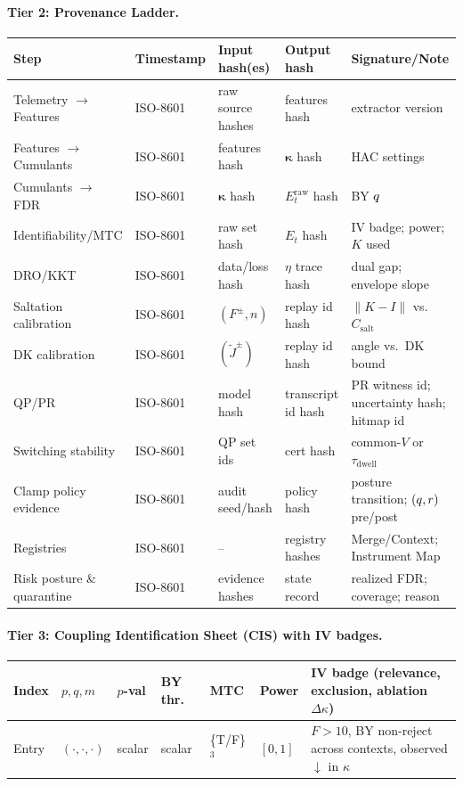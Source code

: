 \paragraph{Tier 2: Provenance Ladder.}
\begin{center}
\renewcommand{\arraystretch}{1.12}
\begin{tabularx}{\textwidth}{@{} l l X X X @{}}
\toprule
\textbf{Step} & \textbf{Timestamp} & \textbf{Input hash(es)} & \textbf{Output hash} & \textbf{Signature/Note} \\
\midrule
Telemetry $\to$ Features & ISO-8601 & raw source hashes & features hash & extractor version \\
Features $\to$ Cumulants & ISO-8601 & features hash & $\bm\kappa$ hash & HAC settings \\
Cumulants $\to$ FDR & ISO-8601 & $\bm\kappa$ hash & $E_t^{\mathrm{raw}}$ hash & BY $q$ \\
Identifiability/MTC & ISO-8601 & raw set hash & $E_t$ hash & IV badge; power; $K$ used \\
DRO/KKT & ISO-8601 & data/loss hash & $\eta$ trace hash & dual gap; envelope slope \\
Saltation calibration & ISO-8601 & $(F^\pm,n)$ & replay id hash & $\|K{-}I\|$ vs.\ $C_{\mathrm{salt}}$ \\
DK calibration & ISO-8601 & $(\widetilde J^\pm)$ & replay id hash & angle vs.\ DK bound \\
QP/PR & ISO-8601 & model hash & transcript id hash & PR witness id; uncertainty hash; hitmap id \\
Switching stability & ISO-8601 & QP set ids & cert hash & common-$V$ or $\tau_{\mathrm{dwell}}$ \\
Clamp policy evidence & ISO-8601 & audit seed/hash & policy hash & posture transition; $(q,r)$ pre/post \\
Registries & ISO-8601 & – & registry hashes & Merge/Context; Instrument Map \\
Risk posture \& quarantine & ISO-8601 & evidence hashes & state record & realized FDR; coverage; reason \\
\bottomrule
\end{tabularx}
\end{center}

\paragraph{Tier 3: Coupling Identification Sheet (CIS) with IV badges.}
\begin{center}
\renewcommand{\arraystretch}{1.12}
\begin{tabularx}{\textwidth}{@{} l l l l l l X @{}}
\toprule
\textbf{Index} & \textbf{$p,q,m$} & \textbf{$p$-val} & \textbf{BY thr.} & \textbf{MTC} & \textbf{Power} & \textbf{IV badge (relevance, exclusion, ablation $\Delta\kappa$)} \\
\midrule
Entry & $(\cdot,\cdot,\cdot)$ & scalar & scalar & \{T/F\}$^3$ & $[0,1]$ & $F{>}10$, BY non-reject across contexts, observed $\downarrow$ in $\kappa$ \\
\bottomrule
\end{tabularx}
\end{center}

